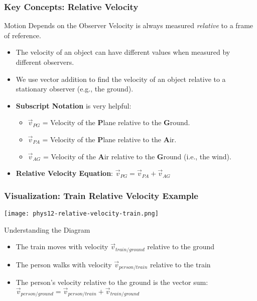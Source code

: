 \documentclass{beamer}
\begin{document}
\begin{frame}
\frametitle{Key Concepts: Relative Velocity}
\begin{block}{Motion Depends on the Observer}
Velocity is always measured \textit{relative} to a frame of reference.
\end{block}
\begin{itemize}
    \item The velocity of an object can have different values when measured by different observers.
    \item We use vector addition to find the velocity of an object relative to a stationary observer (e.g., the ground).
    \item \textbf{Subscript Notation} is very helpful:
    \begin{itemize}
        \item $\vec{v}_{PG}$ = Velocity of the \textbf{P}lane relative to the \textbf{G}round.
        \item $\vec{v}_{PA}$ = Velocity of the \textbf{P}lane relative to the \textbf{A}ir.
        \item $\vec{v}_{AG}$ = Velocity of the \textbf{A}ir relative to the \textbf{G}round (i.e., the wind).
    \end{itemize}
    \item \textbf{Relative Velocity Equation}: $\vec{v}_{PG} = \vec{v}_{PA} + \vec{v}_{AG}$
\end{itemize}
\end{frame}

\begin{frame}
\frametitle{Visualization: Train Relative Velocity Example}
\begin{center}
\texttt{[image: phys12-relative-velocity-train.png]}
\end{center}
\begin{block}{Understanding the Diagram}
\begin{itemize}
    \item The train moves with velocity $\vec{v}_{train/ground}$ relative to the ground
    \item The person walks with velocity $\vec{v}_{person/train}$ relative to the train
    \item The person's velocity relative to the ground is the vector sum: $\vec{v}_{person/ground} = \vec{v}_{person/train} + \vec{v}_{train/ground}$
\end{itemize}
\end{block}
\end{frame}
\end{document}

